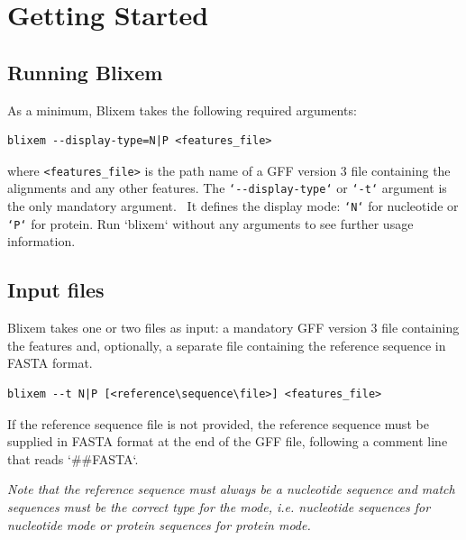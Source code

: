 \documentclass[letterpaper]{article}
\begin{document}
\clearpage
{\color[rgb]{0.0,0.27058825,0.5254902}\section[Getting Started]{Getting Started}}
\hypertarget{RefHeading1461056909880}{}
{\color[rgb]{0.30980393,0.5058824,0.7411765}\subsection[Running Blixem]{Running Blixem}}
\hypertarget{RefHeading1481056909880}{}{
As a minimum, Blixem takes the following required arguments:}
\begin{verbatim}
blixem --display-type=N|P <features_file>
\end{verbatim}
{where \texttt{{\textless}features\_file{\textgreater}} is the path name of a GFF
version 3 file containing the alignments and any other features. The
 \texttt{{\textquoteleft}{}-{}-display-type{\textquoteleft}} or
\texttt{{\textquoteleft}{}-t{\textquoteleft}} argument is the only mandatory
argument. \ It defines the display mode:
\texttt{{\textquoteleft}N{\textquoteleft}} for nucleotide or
\texttt{{\textquoteleft}P{\textquoteleft}} for protein. 
Run {\textquoteleft}blixem{\textquoteleft} without any arguments to see
further usage information.}

{\color[rgb]{0.30980393,0.5058824,0.7411765}\subsection[Input files]{Input files}}
\hypertarget{RefHeading1501056909880}{}{
Blixem takes one or two files as input: a mandatory GFF version 3 file
containing the features and, optionally, a separate file containing the
reference sequence in FASTA format.}

\begin{verbatim}
blixem --t N|P [<reference\sequence\file>] <features_file>
\end{verbatim}

{If the reference sequence file is not provided, the reference sequence
must be supplied in FASTA format at the end of the GFF file, following
a comment line that reads {\textquoteleft}\#\#FASTA{\textquoteleft}.}


\bigskip

{\itshape
Note that the reference sequence must always be a nucleotide sequence
and match sequences must be the correct type for the mode, i.e.
nucleotide sequences for nucleotide mode or protein sequences for
protein mode.}
\end{document}
